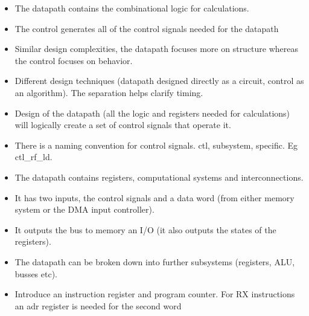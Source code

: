 \documentclass{article}
\begin{document}
\begin{itemize}
\item The datapath contains the combinational logic for calculations.
\item The control generates all of the control signals needed for the datapath
\item Similar design complexities, the datapath focuses more on structure whereas the control focuses on behavior.
\item Different design techniques (datapath designed directly as a circuit, control as an algorithm). The separation helps clarify timing.
\item Design of the datapath (all the logic and registers needed for calculations) will logically create a set of control signals that operate it.
\item There is a naming convention for control signals. ctl, subsystem, specific. Eg ctl\_rf\_ld.
\item The datapath contains registers, computational systems and interconnections.
\item It has two inputs, the control signals and a data word (from either memory system or the DMA input controller).
\item It outputs the bus to memory an I/O (it also outputs the states of the registers).
\item The datapath can be broken down into further subsystems (registers, ALU, busses etc).
\item Introduce an instruction register and program counter. For RX instructions an adr register is needed for the second word
\end{itemize}
\end{document}
